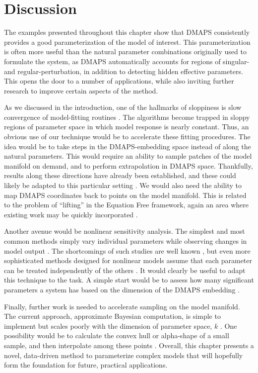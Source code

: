 \section{Discussion}

The examples presented throughout this chapter show that DMAPS
consistently provides a good parameterization of the model of
interest. This parameterization is often more useful than the natural
parameter combinations originally used to formulate the system, as
DMAPS automatically accounts for regions of singular- and
regular-perturbation, in addition to detecting hidden effective
parameters. This opens the door to a number of applications, while
also inviting further research to improve certain aspects of the
method.

As we discussed in the introduction, one of the hallmarks of
sloppiness is slow convergence of model-fitting routines
\cite{transtrum_geometry_2011}. The algorithms become trapped in
sloppy regions of parameter space in which model response is nearly
constant. Thus, an obvious use of our technique would be to accelerate
these fitting procedures. The idea would be to take steps in the
DMAPS-embedding space instead of along the natural parameters. This
would require an ability to sample patches of the model manifold on
demand, and to perform extrapolation in DMAPS space. Thankfully,
results along these directions have already been established, and
these could likely be adapted to this particular setting
\cite{chiavazzo_intrinsic_2017}. We would also need the ability to map
DMAPS coordinates back to points on the model manifold. This is
related to the problem of ``lifting'' in the Equation Free framework,
again an area where existing work may be quickly incorporated
\cite{rajendran_data_2016,laing_equation-free_2015,laing_coarse-grained_2007}.

Another avenue would be nonlinear sensitivity analysis. The
simplest and most common methods simply vary individual parameters
while observing changes in model output
\cite{murphy_quantification_2004}. The shortcomings of such studies
are well known \cite{saltelli_how_2010},
but even more sophisticated methods designed for nonlinear models
assume that each parameter can be treated independently of the
others \cite{cukier_nonlinear_1978}. It would clearly be useful to
adapt this technique to the task. A simple start would be to assess
how many significant parameters a system has based on the dimension of
the DMAPS embedding \cite{dsilva_parsimonious_2015}.

Finally, further work is needed to accelerate sampling on the model
manifold. The current approach, approximate Bayesian computation, is
simple to implement but scales poorly with the dimension of parameter
space, $k$ \cite{turner_tutorial_2012}. One possibility would be to
calculate the convex hull or alpha-shape of a small sample, and then
interpolate among these points
\cite{barber_quickhull_1996,edelsbrunner_three-dimensional_1994}. Overall,
this chapter presents a novel, data-driven method to parameterize
complex models that will hopefully form the foundation for future,
practical applications.


